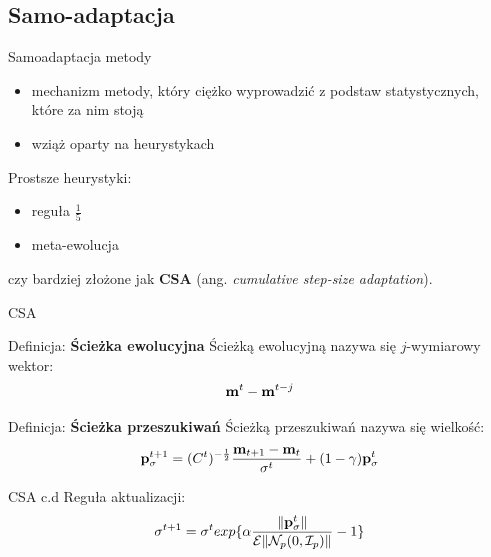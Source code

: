 \documentclass[slidescentered]{beamer}
\newcommand{\wek}[1]{
	{\bf #1} 
}
\begin{document}
\subsection{Samo-adaptacja}

\begin{frame}{Samoadaptacja metody}
	\begin{itemize}
		\item mechanizm metody, który ciężko wyprowadzić z podstaw statystycznych, które za nim stoją
	\pause 	\item wziąż oparty na heurystykach
	\end{itemize}
\end{frame}

\begin{frame}
	Prostsze heurystyki:
	\begin{itemize}
		\pause 	\item reguła $\frac{1}{5}$
		\pause \item meta-ewolucja
	\end{itemize}
	czy bardziej złożone jak \textbf{CSA} (ang. \textit{cumulative step-size adaptation}).
\end{frame}

\begin{frame}{CSA}
	\begin{block}{Definicja: \textbf{Ścieżka ewolucyjna}}
		Ścieżką ewolucyjną nazywa się $j$-wymiarowy wektor:
		\begin{equation}
			\wek{m}^{t} - \wek{m}^{t-j}
		\end{equation}
	\end{block}
\pause 
	\begin{block}{Definicja: \textbf{Ścieżka przeszukiwań}}
		Ścieżką przeszukiwań nazywa się wielkość: 
		\begin{equation}
			\wek{p}^{t+1}_{\sigma} = (C^{t})^{-\frac{1}{2}}\frac{\wek{m}_{t+1} - \wek{m}_{t}}{\sigma^{t}} + (1 - \gamma)\wek{p}^{t}_{\sigma}
		\end{equation}
	\end{block}
\end{frame}

\begin{frame}{CSA c.d}
Reguła aktualizacji:
	\begin{equation}
	\sigma^{t+1} = \sigma^{t}exp\LARGE\{\alpha\frac{\|\wek{p}^{t}_{\sigma}\|}{\mathcal{E}\|\mathcal{N}_{p}(0, \mathcal{I}_{p})\|} -1\LARGE\}
	\end{equation}

\end{frame}
\end{document}
